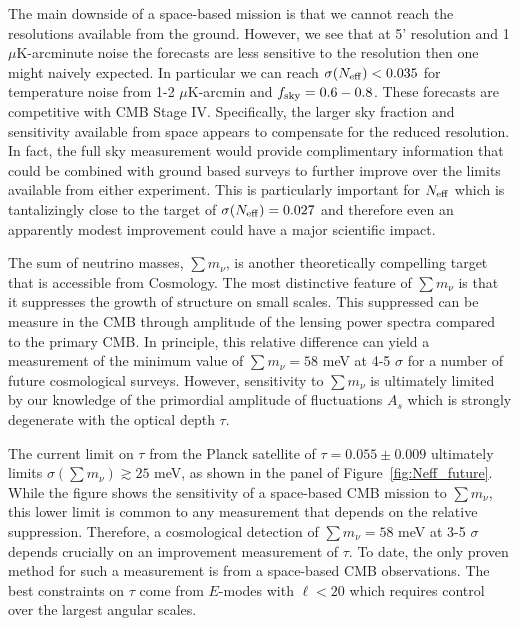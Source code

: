 The main downside of a space-based mission is that we cannot reach the resolutions available from the ground.  However, we see that at 5' resolution and 1 $\mu$K-arcminute noise the forecasts are less sensitive to the resolution then one might naively expected.  In particular we can reach $\sigma({N_{\rm eff}}) < 0.035$ for temperature noise from 1-2 $\mu$K-arcmin and $f_{\rm sky} =0.6-0.8$.  These forecasts are competitive with CMB Stage IV.  Specifically, the larger sky fraction and sensitivity available from space appears to compensate for the reduced resolution.  In fact, the full sky measurement would provide complimentary information that could be combined with ground based surveys to further improve over the limits available from either experiment.  This is particularly important for ${N_{\rm eff}}$ which is tantalizingly close to the target of $\sigma({N_{\rm eff}}) =0.027$ and therefore even an apparently modest improvement could have a major scientific impact.  

The sum of neutrino masses, $\sum m_\nu$, is another theoretically compelling target that is accessible from Cosmology.  The most distinctive feature of $\sum m_\nu$ is that it suppresses the growth of structure on small scales.  This suppressed can be measure in the CMB through amplitude of the lensing power spectra compared to the primary CMB.  In principle, this relative difference can yield a measurement  of the minimum value of $\sum m_\nu =58$ meV at 4-5 $\sigma$ for a number of future cosmological surveys.  However, sensitivity to $\sum m_\nu$ is ultimately limited by our knowledge of the primordial amplitude of fluctuations $A_s$ which is strongly degenerate with the optical depth $\tau$. 

The current limit on $\tau$ from the Planck satellite of $\tau = 0.055 \pm 0.009$ ultimately limits $\sigma(\sum m_\nu) \gtrsim 25$ meV, as shown in the panel of Figure~\ref{fig:Neff_future}.  While the figure shows the sensitivity of a space-based CMB mission to $\sum m_\nu$, this lower limit is common to any measurement that depends on the relative suppression.  Therefore, a cosmological detection of $\sum m_\nu = 58$ meV at 3-5 $\sigma$ depends crucially on an improvement measurement of $\tau$.  To date, the only proven method for such a measurement is from a space-based CMB observations.  The best constraints on $\tau$ come from $E$-modes with $\ell < 20$ which requires control over the largest angular scales.  


